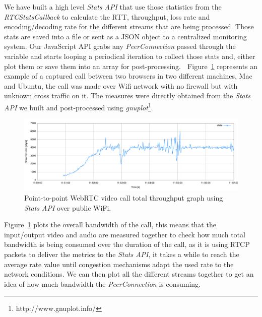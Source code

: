 We have built a high level {\it Stats API} that use those statistics from the {\it RTCStatsCallback} to calculate the RTT, throughput, loss rate and encoding/decoding rate for the different streams that are being processed. Those stats are saved into a file or sent as a JSON object to a centralized monitoring system. Our JavaScript API grabs any {\it PeerConnection} passed through the variable and starts looping a periodical iteration to collect those stats and, either plot them or save them into an array for post-processing. 

Figure~\ref{fig:onetooneWifiRTC} represents an example of a captured call between two browsers in two different machines, Mac and Ubuntu, the call was made over Wifi network with no firewall but with unknown cross traffic on it. The measures were directly obtained from the {\it Stats API} we built and post-processed using {\it gnuplot}\footnote{http://www.gnuplot.info/}.

 \begin{figure}[h]
  \centering
    \includegraphics[width=1\textwidth]{./figures/onetooneWifiStatsRTC.pdf}
      \caption[Point-to-point WebRTC video call total throughput graph using {\it Stats API} over public WiFi]{Point-to-point WebRTC video call total throughput graph using {\it Stats API} over public WiFi.}
	\label{fig:onetooneWifiRTC}
\end{figure}

Figure~\ref{fig:onetooneWifiRTC} plots the overall bandwidth of the call, this means that the input/output video and audio are measured together to check how much total bandwidth is being consumed over the duration of the call, as it is using RTCP packets to deliver the metrics to the {\it Stats API}, it takes a while to reach the average rate value until congestion mechanisms adapt the used rate to the network conditions. We can then plot all the different streams together to get an idea of how much bandwidth the {\it PeerConnection} is consuming.

